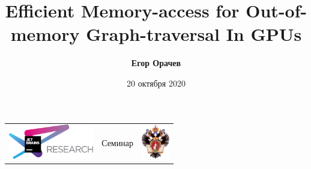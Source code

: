 \documentclass[xcolor=table,english]{beamer}
\title[Graphs Traveral GPU]{Efficient Memory-access for Out-of-memory Graph-traversal In GPUs}
\institute[СПбГУ]{
JetBrains Research, Лаборатория языковых инструментов  \\
Санкт-Петербургский Государственный университет
}
\author[Егор Орачев]{\textbf{Егор Орачев}}
\date{20 октября 2020}
\begin{document}
{
\begin{frame}[fragile]
  \begin{table}
  \centering
  \begin{tabularx}{\linewidth}{YcX}
    \includegraphics[height=1.5cm]{pictures/jetbrainsResearch.pdf} \hfill
    & \begin{minipage}[t]{0.3\textwidth}\center \vspace{-1cm}  Семинар
      \end{minipage}
    & \hfill \includegraphics[height=1.5cm]{pictures/SPbGU_Logo.png}
  \end{tabularx}
  \end{table}
  \titlepage
\end{frame}
}
\end{document}
